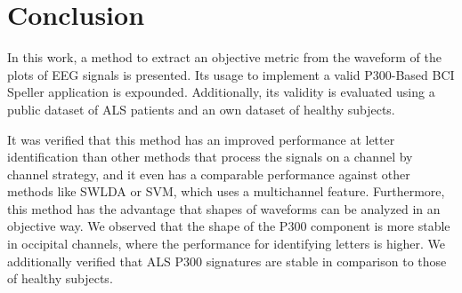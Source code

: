 \section{Conclusion}




In this work, a method to extract an objective metric from the waveform of the plots of EEG signals is presented.  Its usage to implement a valid P300-Based BCI Speller application is expounded.  Additionally, its validity is evaluated using a public dataset of ALS patients and an own dataset of healthy subjects.   


It was verified that this method has an improved performance at letter identification than other methods that process the signals on a channel by channel strategy, and it even has a comparable performance against other methods like SWLDA or SVM, which uses a multichannel feature.
Furthermore, this method has the advantage that shapes of waveforms can be analyzed in an objective way.  We observed that the shape of the P300 component is more stable in occipital channels, where the performance for identifying letters is higher.   We additionally verified that ALS P300 signatures are stable in comparison to those of healthy subjects.

